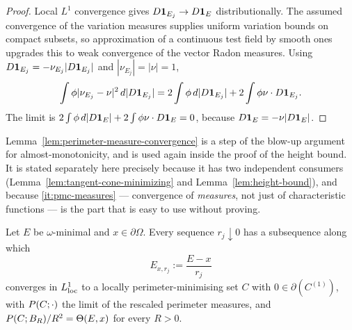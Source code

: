 \begin{proof}
Local $L^1$ convergence gives $D\mathbf 1_{E_j}\to D\mathbf 1_{E}$ distributionally.
The assumed convergence of the variation measures supplies uniform variation
bounds on compact subsets, so approximation of a continuous test field by
smooth ones upgrades this to weak convergence of the vector Radon measures.
Using $D\mathbf 1_{E_j}=-\nu_{E_j}|D\mathbf 1_{E_j}|$ and $|\nu_{E_j}|=|\nu|=1$,
\[
 \int\phi|\nu_{E_j}-\nu|^2\,d|D\mathbf 1_{E_j}|
 =2\int\phi\,d|D\mathbf 1_{E_j}|+2\int\phi\nu\cdot D\mathbf 1_{E_j}.
\]
The limit is
$2\int\phi\,d|D\mathbf 1_{E}|+2\int\phi\nu\cdot D\mathbf 1_{E}=0$, because
$D\mathbf 1_{E}=-\nu|D\mathbf 1_{E}|$.
\end{proof}

\begin{fnote}\label{fnote:pmc-extracted}
Lemma~\ref{lem:perimeter-measure-convergence} is a step of the blow-up
argument for almost-monotonicity, and is used again inside the proof of the
height bound.  It is stated separately here precisely because
it has two independent consumers
(Lemma~\ref{lem:tangent-cone-minimizing} and Lemma~\ref{lem:height-bound}),
and because \ref{it:pmc-measures} --- convergence of \emph{measures}, not just
of characteristic functions --- is the part that is easy to use without
proving.
\end{fnote}

\begin{lemma}\label{lem:tangent-cone-minimizing}
Let $E$ be $\omega$-minimal and $x\in\partial\Omega$.  Every sequence
$r_j\downarrow0$ has a subsequence along which
\begin{equation}\label{eq:blowup-family}
  E_{x,r_j}:=\frac{E-x}{r_j}
\end{equation}
converges in $L^1_{\mathrm{loc}}$ to a locally perimeter-minimising set $C$ with
$0\in\partial(C^{(1)})$, with $P(C;\cdot)$ the limit of the rescaled
perimeter measures, and
$P(C;B_R)/R^2=\Theta(E,x)$ for every $R>0$.
\end{lemma}

